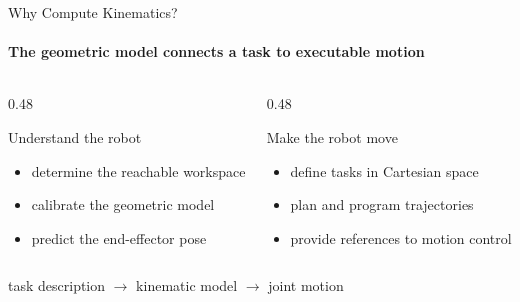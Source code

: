 \documentclass[aspectratio=169]{beamer}
\begin{document}
\begin{frame}[t]{Why Compute Kinematics?}
    \framesubtitle{The geometric model connects a task to executable motion}
    \begin{columns}[T,onlytextwidth]
        \begin{column}{0.48\textwidth}
            \begin{block}{Understand the robot}
                \begin{itemize}
                    \item determine the reachable workspace
                    \item calibrate the geometric model
                    \item predict the end-effector pose
                \end{itemize}
            \end{block}
        \end{column}
        \begin{column}{0.48\textwidth}
            \begin{block}{Make the robot move}
                \begin{itemize}
                    \item define tasks in Cartesian space
                    \item plan and program trajectories
                    \item provide references to motion control
                \end{itemize}
            \end{block}
        \end{column}
    \end{columns}
    \bigskip
    \centering
    \Large
    task description $\longrightarrow$ kinematic model
    $\longrightarrow$ joint motion
\end{frame}
\end{document}

